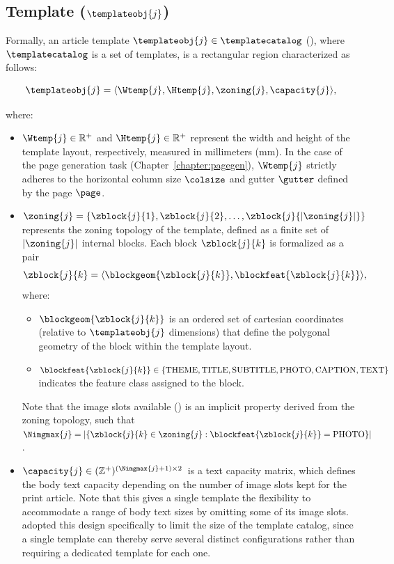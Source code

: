 \subsection{Template ($\templateobj{j}$)}
\label{sec:template}
Formally, an article template $\templateobj{j} \in \templatecatalog$ (), where $\templatecatalog$ is a set of templates, is a rectangular region characterized as follows:

\begin{equation}
\templateobj{j} = \langle \Wtemp{j}, \Htemp{j}, \zoning{j}, \capacity{j} \rangle,
\end{equation}

where:
\begin{itemize}
    \item $\Wtemp{j} \in \mathbb{R}^+$ and $\Htemp{j} \in \mathbb{R}^+$ represent the  width and height of the template layout, respectively, measured in millimeters (mm). In the case of the page generation task (Chapter~\ref{chapter:pagegen}), $\Wtemp{j}$ strictly adheres to the horizontal column size $\colsize$ and gutter $\gutter$ defined by the page $\page$.
    \item $\zoning{j} = \{\zblock{j}{1}, \zblock{j}{2}, \dots, \zblock{j}{|\zoning{j}|}\}$ represents the zoning topology of the template, defined as a finite set of $|\zoning{j}|$ internal blocks. 
    Each block $\zblock{j}{k}$ is formalized as a pair
    $$\zblock{j}{k}= \langle \blockgeom{\zblock{j}{k}}, \blockfeat{\zblock{j}{k}} \rangle,$$
    where:
    \begin{itemize}
        \item $\blockgeom{\zblock{j}{k}}$ is an ordered set of cartesian coordinates (relative to $\templateobj{j}$ dimensions) that define the polygonal geometry of the block within the template layout.
        \item $\blockfeat{\zblock{j}{k}} \in \{\text{THEME}, \text{TITLE}, \text{SUBTITLE}, \text{PHOTO}, \text{CAPTION}, \text{TEXT}\}$ indicates the feature class assigned to the block.
    \end{itemize}
    Note that the image slots available () is an implicit property derived from the zoning topology, such that $\Nimgmax{j} = |\{\zblock{j}{k} \in \zoning{j} : \blockfeat{\zblock{j}{k}} = \text{PHOTO}\}|$.

    \item $\capacity{j} \in (\mathbb{Z}^+)^{(\Nimgmax{j} + 1) \times 2}$\ is a text capacity matrix, which defines the body text capacity depending on the number of image slots kept for the print article. Note that this gives a single template the flexibility to accommodate a range of body text sizes by omitting some of its image slots. \melody adopted this design specifically to limit the size of the template catalog, since a single template can thereby serve several distinct configurations rather than requiring a dedicated template for each one.
    

\end{itemize}
